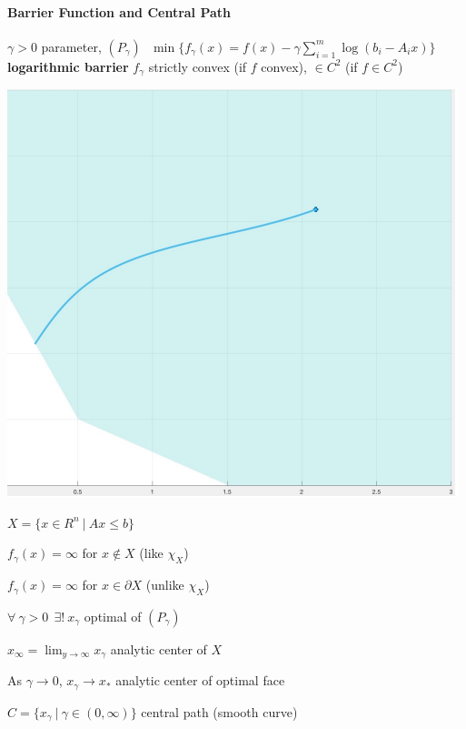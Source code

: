 \documentclass[10pt]{report}
\begin{document}
\paragraph{Barrier Function and Central Path} $\gamma > 0$ parameter, $(P_\gamma)\:\:\:\min\{f_\gamma(x) = f(x) - \gamma\sum_{i=1}^m \log(b_i-A_i x)\}$ \textbf{logarithmic barrier} $f_\gamma$ strictly convex (if $f$ convex), $\in C^2$ (if $f\in C^2$)
\begin{multicols}{2}
\begin{center}
	\includegraphics[scale=0.6]{15.png}
\end{center}
\begin{list}{}{}
	\item $X=\{x\in R^n\:|\:Ax\leq b\}$
	\item $f_\gamma(x)=  \infty$ for $x\not\in X$ (like $\chi_X$)
	\item $f_\gamma(x)=  \infty$ for $x\in \partial X$ (unlike $\chi_X$)
	\item $\forall\:\gamma>0\:\:\exists!\:x_\gamma$ optimal of $(P_\gamma)$
	\item $x_\infty = \lim_{y\to\infty} x_\gamma$ analytic center of $X$
	\item As $\gamma \rightarrow 0$, $x_\gamma\rightarrow x_*$ analytic center of optimal face
	\item $C = \{x_\gamma\:|\:\gamma\in(0,\infty)\}$ central path (smooth curve)
\end{list}
\end{multicols}
\end{document}
